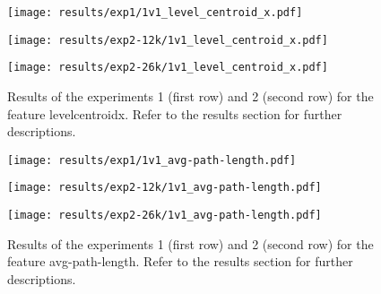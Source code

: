 \begin{figure}[h!]
    \centering
	\begin{minipage}{0.3\linewidth}
		\texttt{[image: results/exp1/1v1\_level\_centroid\_x.pdf]}
	\end{minipage}

	\begin{minipage}{0.3\linewidth}
		\texttt{[image: results/exp2-12k/1v1\_level\_centroid\_x.pdf]}
	\end{minipage}
	\begin{minipage}{0.3\linewidth}
		\texttt{[image: results/exp2-26k/1v1\_level\_centroid\_x.pdf]}
	\end{minipage}

	\caption[ Results: Feature level\textunderscore centroid\textunderscore x]{ Results of the experiments 1 (first row) and 2 (second row) for the feature level\textunderscore centroid\textunderscore x. Refer to the results section for further descriptions. }
	\label{fig:appendix_level_centroid_x}
\end{figure}
 \newpage 

 
\begin{figure}[h!]
    \centering
	\begin{minipage}{0.3\linewidth}
		\texttt{[image: results/exp1/1v1\_avg-path-length.pdf]}
	\end{minipage}

	\begin{minipage}{0.3\linewidth}
		\texttt{[image: results/exp2-12k/1v1\_avg-path-length.pdf]}
	\end{minipage}
	\begin{minipage}{0.3\linewidth}
		\texttt{[image: results/exp2-26k/1v1\_avg-path-length.pdf]}
	\end{minipage}

	\caption[ Results: Feature avg-path-length]{ Results of the experiments 1 (first row) and 2 (second row) for the feature avg-path-length. Refer to the results section for further descriptions. }
	\label{fig:appendix_avg-path-length}
\end{figure}
 
